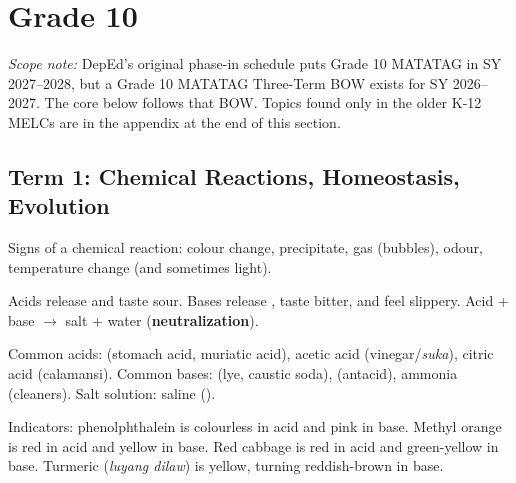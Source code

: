 \section{Grade 10}
\resetcards
{\small\textit{Scope note:} DepEd's original phase-in schedule puts Grade 10 MATATAG in SY 2027--2028, but a Grade 10 MATATAG Three-Term BOW exists for SY 2026--2027. The core below follows that BOW. Topics found only in the older K-12 MELCs are in the appendix at the end of this section. \par}
\begin{gradebody}

\subsection{Term 1: Chemical Reactions, Homeostasis, Evolution}

\kf
\begin{keyfacts}
\item Signs of a chemical reaction: colour change, precipitate, gas (bubbles), odour, temperature change (and sometimes light).
\item Acids release  and taste sour. Bases release , taste bitter, and feel slippery. Acid + base $\rightarrow$ salt + water (\textbf{neutralization}).
\item Common acids:  (stomach acid, muriatic acid), acetic acid (vinegar/\emph{suka}), citric acid (calamansi). Common bases:  (lye, caustic soda),  (antacid), ammonia (cleaners). Salt solution: saline ().
\item Indicators: phenolphthalein is colourless in acid and pink in base. Methyl orange is red in acid and yellow in base. Red cabbage is red in acid and green-yellow in base. Turmeric (\emph{luyang dilaw}) is yellow, turning reddish-brown in base.
\end{keyfacts}
\cards
{}


\end{gradebody}
